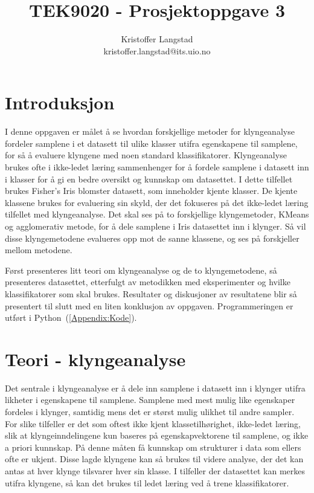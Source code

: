 \documentclass[twocolumn,norwegian]{article}
\title{TEK9020 - Prosjektoppgave 3}
\author{Kristoffer Langstad \\ kristoffer.langstad@its.uio.no}
\date{}
\begin{document}
	
	\maketitle
	
	\section{Introduksjon}
	I denne oppgaven er målet å se hvordan forskjellige metoder for klyngeanalyse fordeler samplene i et datasett til ulike klasser utifra egenskapene til samplene, for så å evaluere klyngene med noen standard klassifikatorer. Klyngeanalyse brukes ofte i ikke-ledet læring sammenhenger for å fordele samplene i datasett inn i klasser for å gi en bedre oversikt og kunnskap om datasettet. I dette tilfellet brukes Fisher's Iris blomster datasett, som inneholder kjente klasser. De kjente klassene brukes for evaluering sin skyld, der det fokuseres på det ikke-ledet læring tilfellet med klyngeanalyse. Det skal ses på to forskjellige klyngemetoder, KMeans og agglomerativ metode, for å dele samplene i Iris datasettet inn i klynger. Så vil disse klyngemetodene evalueres opp mot de sanne klassene, og ses på forskjeller mellom metodene.
	
	Først presenteres litt teori om klyngeanalyse og de to klyngemetodene, så presenteres datasettet, etterfulgt av metodikken med eksperimenter og hvilke klassifikatorer som skal brukes. Resultater og diskusjoner av resultatene blir så presentert til slutt med en liten konklusjon av oppgaven. Programmeringen er utført i Python~(\ref{Appendix:Kode}).

	
	\section{Teori - klyngeanalyse}
	Det sentrale i klyngeanalyse er å dele inn samplene i datasett inn i klynger utifra likheter i egenskapene til samplene. Samplene med mest mulig like egenskaper fordeles i klynger, samtidig mens det er størst mulig ulikhet til andre sampler. For slike tilfeller er det som oftest ikke kjent klassetilhørighet, ikke-ledet læring, slik at klyngeinndelingene kun baseres på egenskapvektorene til samplene, og ikke a priori kunnskap. På denne måten få kunnskap om strukturer i data som ellers ofte er ukjent. Disse lagde klyngene kan så brukes til videre analyse, der det kan antas at hver klynge tilsvarer hver sin klasse. I tilfeller der datasettet kan merkes utifra klyngene, så kan det brukes til ledet læring ved å trene klassifikatorer.
\end{document}
